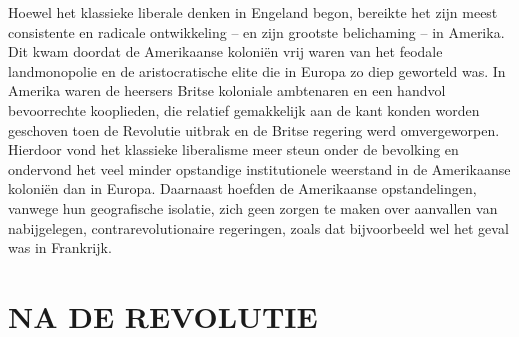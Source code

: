 \documentclass[
  a5paper,
  smalldemyvopaper,10pt,twoside,onecolumn,openright,extrafontsizes,hidelinks]{memoir}
\begin{document}
Hoewel het klassieke liberale denken in Engeland begon, bereikte het
zijn meest consistente en radicale ontwikkeling -- en zijn grootste
belichaming -- in Amerika. Dit kwam doordat de Amerikaanse koloniën vrij
waren van het feodale landmonopolie en de aristocratische elite die in
Europa zo diep geworteld was. In Amerika waren de heersers Britse
koloniale ambtenaren en een handvol bevoorrechte kooplieden, die
relatief gemakkelijk aan de kant konden worden geschoven toen de
Revolutie uitbrak en de Britse regering werd omvergeworpen. Hierdoor
vond het klassieke liberalisme meer steun onder de bevolking en
ondervond het veel minder opstandige institutionele weerstand in de
Amerikaanse koloniën dan in Europa. Daarnaast hoefden de Amerikaanse
opstandelingen, vanwege hun geografische isolatie, zich geen zorgen te
maken over aanvallen van nabijgelegen, contrarevolutionaire regeringen,
zoals dat bijvoorbeeld wel het geval was in Frankrijk.

\section{NA DE REVOLUTIE}\label{na-de-revolutie}
\end{document}

